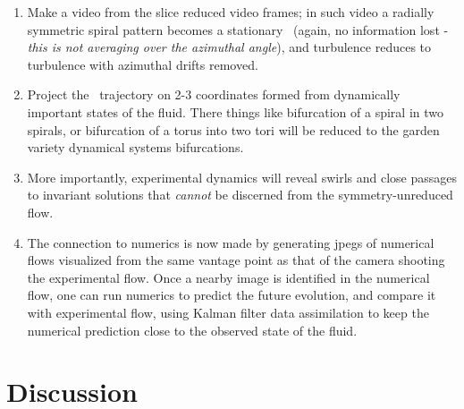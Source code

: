\begin{enumerate}
\item Make a video from the slice reduced video frames; in such video a
radially symmetric spiral pattern becomes a stationary \reqv\ (again, no
information lost - \emph{this is not averaging over the azimuthal
angle}), and turbulence reduces to turbulence with azimuthal drifts
removed.

    \item Project the \statesp\ trajectory on 2-3 coordinates formed from
dynamically important states of the fluid. There things like
bifurcation of a spiral in two spirals, or bifurcation of a torus into
two tori will be reduced to the garden variety dynamical systems
bifurcations.

    \item More importantly, experimental dynamics will reveal swirls and
close passages to invariant solutions that \emph{cannot} be discerned from the
symmetry-unreduced flow.

    \item The connection to numerics is now made by generating jpegs of
numerical flows visualized from the same vantage point as that of the camera
shooting the experimental flow. Once a nearby image is identified in the
numerical flow, one can run numerics to predict the future evolution, and
compare it with experimental flow, using Kalman filter data assimilation
to keep the numerical prediction close to the observed state of the
fluid.
\end{enumerate}

\section{Discussion}

